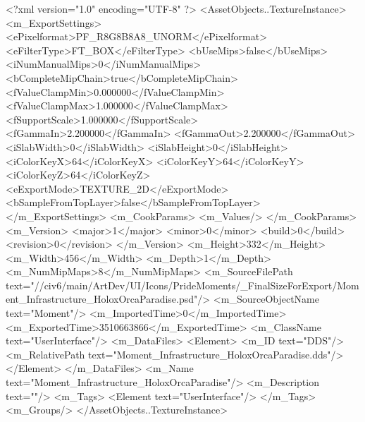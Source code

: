 <?xml version="1.0" encoding="UTF-8" ?>
<AssetObjects..TextureInstance>
	<m_ExportSettings>
		<ePixelformat>PF_R8G8B8A8_UNORM</ePixelformat>
		<eFilterType>FT_BOX</eFilterType>
		<bUseMips>false</bUseMips>
		<iNumManualMips>0</iNumManualMips>
		<bCompleteMipChain>true</bCompleteMipChain>
		<fValueClampMin>0.000000</fValueClampMin>
		<fValueClampMax>1.000000</fValueClampMax>
		<fSupportScale>1.000000</fSupportScale>
		<fGammaIn>2.200000</fGammaIn>
		<fGammaOut>2.200000</fGammaOut>
		<iSlabWidth>0</iSlabWidth>
		<iSlabHeight>0</iSlabHeight>
		<iColorKeyX>64</iColorKeyX>
		<iColorKeyY>64</iColorKeyY>
		<iColorKeyZ>64</iColorKeyZ>
		<eExportMode>TEXTURE_2D</eExportMode>
		<bSampleFromTopLayer>false</bSampleFromTopLayer>
	</m_ExportSettings>
	<m_CookParams>
		<m_Values/>
	</m_CookParams>
	<m_Version>
		<major>1</major>
		<minor>0</minor>
		<build>0</build>
		<revision>0</revision>
	</m_Version>
	<m_Height>332</m_Height>
	<m_Width>456</m_Width>
	<m_Depth>1</m_Depth>
	<m_NumMipMaps>8</m_NumMipMaps>
	<m_SourceFilePath text="//civ6/main/ArtDev/UI/Icons/PrideMoments/_FinalSizeForExport/Moment_Infrastructure_HoloxOrcaParadise.psd"/>
	<m_SourceObjectName text="Moment"/>
	<m_ImportedTime>0</m_ImportedTime>
	<m_ExportedTime>3510663866</m_ExportedTime>
	<m_ClassName text="UserInterface"/>
	<m_DataFiles>
		<Element>
			<m_ID text="DDS"/>
			<m_RelativePath text="Moment_Infrastructure_HoloxOrcaParadise.dds"/>
		</Element>
	</m_DataFiles>
	<m_Name text="Moment_Infrastructure_HoloxOrcaParadise"/>
	<m_Description text=""/>
	<m_Tags>
		<Element text="UserInterface"/>
	</m_Tags>
	<m_Groups/>
</AssetObjects..TextureInstance>

